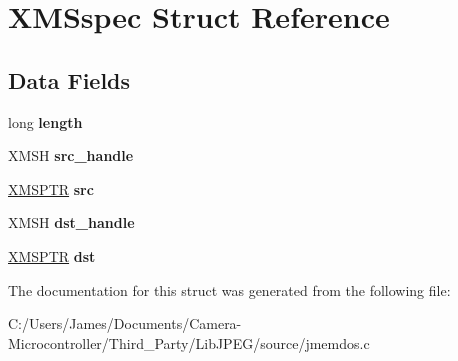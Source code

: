 \hypertarget{struct_x_m_sspec}{}\section{X\+M\+Sspec Struct Reference}
\label{struct_x_m_sspec}
\subsection*{Data Fields}
\begin{DoxyCompactItemize}
\item 
\mbox{\label{struct_x_m_sspec_ae2b29049fcd8b777a54a1529743b2390}} 
long {\bfseries length}
\item 
\mbox{\label{struct_x_m_sspec_a8c0ace807115b409ab36811386e02921}} 
X\+M\+SH {\bfseries src\+\_\+handle}
\item 
\mbox{\label{struct_x_m_sspec_a1cbf246ad910024b50a9c18b721382b6}} 
\hyperlink{union_x_m_s_p_t_r}{X\+M\+S\+P\+TR} {\bfseries src}
\item 
\mbox{\label{struct_x_m_sspec_ab99cc755b20621a6ede8e178c903a401}} 
X\+M\+SH {\bfseries dst\+\_\+handle}
\item 
\mbox{\label{struct_x_m_sspec_a8a5693f28944b64614f36b7d7b6e41e8}} 
\hyperlink{union_x_m_s_p_t_r}{X\+M\+S\+P\+TR} {\bfseries dst}
\end{DoxyCompactItemize}


The documentation for this struct was generated from the following file\+:\begin{DoxyCompactItemize}
\item 
C\+:/\+Users/\+James/\+Documents/\+Camera-\/\+Microcontroller/\+Third\+\_\+\+Party/\+Lib\+J\+P\+E\+G/source/jmemdos.\+c\end{DoxyCompactItemize}
